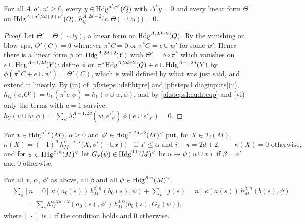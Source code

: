 \begin{lemma}\label{pf:steps1:kill}
For all $A,a',n'\ge0$, every $y\in\mathrm{Hdg}^{a',n'}(Q)$ with $\Delta^*y=0$ and every linear form $\Theta$ on
$\mathrm{Hdg}^{A+a',2d+2+n'}(Q)$, $h_Q^{A,2d+2}\bigl(c,\Theta(\,\cdot\cup y)\bigr)=0$.
\end{lemma}

\begin{proof}
Let $\Theta'=\Theta(\,\cdot\cup y)$, a linear form on $\mathrm{Hdg}^{A,2d+2}(Q)$. By the vanishing on blow-ups, $\Theta'(C)=0$ whenever
$\pi^*C=0$ or $\pi^*C=e\cup w'$ for some $w'$. Hence there is a linear form $\phi$ on $\mathrm{Hdg}^{A,2d+2}(Y)$ with
$\Theta'=\phi\circ\pi^*$ which vanishes on $e\cup\mathrm{Hdg}^{A-1,2d}(Y)$: define $\phi$ on $\pi^*\mathrm{Hdg}^{A,2d+2}(Q)+
e\cup\mathrm{Hdg}^{A-1,2d}(Y)$ by $\phi(\pi^*C+e\cup w')=\Theta'(C)$, which is well defined by what was just said, and extend it
linearly. By (iii) of \cref{pf:steps1:def:htpre} and \cref{pf:steps1:diaginputs}(ii), $h_Q(c,\Theta')=h_Y(\pi^*c,\phi)=
h_Y(v\cup w,\phi)$, and by \eqref{pf:steps1:eq:htcup} and (vi) only the terms with $a=1$ survive:
$h_Y(v\cup w,\phi)=\sum_{s'}h_Y^{A-1,2d}(w,e'^*_{s'})\,\phi(e\cup e'_{s'})=0$.
\end{proof}

For $x\in\mathrm{Hdg}^{a',n}(M)$, $\alpha\ge0$ and $\phi'\in\mathrm{Hdg}^{\alpha,2d+2}(M)^\vee$ put, for $X\in T_i(M)$,
\[
 \kappa(X)=(-1)^{n}\,h_M^{\alpha-a',i}\bigl(X,\phi'(\,\cdot\cup x)\bigr)\quad\text{if }a'\le\alpha\text{ and }i+n=2d+2,
 \qquad\kappa(X)=0\text{ otherwise},
\]
and for $\psi\in\mathrm{Hdg}^{\beta,n}(M)^\vee$ let $G_x(\psi)\in\mathrm{Hdg}^{0,0}(M)^\vee$ be $u\mapsto\psi(u\cup x)$ if $\beta=a'$ and $0$
otherwise.

\begin{lemma}\label{pf:steps1:eid}
For all $x$, $\alpha$, $\phi'$ as above, all $\beta$ and all $\psi\in\mathrm{Hdg}^{\beta,n}(M)^\vee$,
\begin{equation}\label{pf:steps1:eq:eid}
\begin{aligned}
 &\sum_s[n=0]\,\kappa(a_0(s))\,h_M^{\beta,n}(b_0(s),\psi)+\sum_s[j(s)=n]\,\kappa(a(s))\,h_M^{\beta,n}(b(s),\psi)\\
 &\qquad=\sum_sh_M^{\alpha,2d+2}(a_0(s),\phi')\,h_M^{0,0}\bigl(b_0(s),G_x(\psi)\bigr),
\end{aligned}
\end{equation}
where $[\,\cdot\,]$ is $1$ if the condition holds and $0$ otherwise.
\end{lemma}

